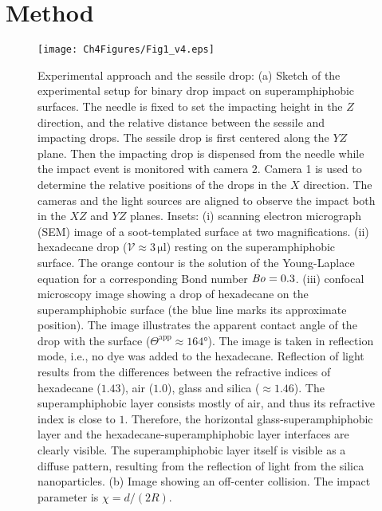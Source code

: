 \section{Method}\label{Ch5:Method}
\begin{figure}
	\centering
	\texttt{[image: Ch4Figures/Fig1\_v4.eps]}
	\caption{Experimental approach and the sessile drop: (a) Sketch of the experimental setup for binary drop impact on superamphiphobic surfaces. The needle is fixed to set the impacting height in the $Z$ direction, and the relative distance between the sessile and impacting drops. The sessile drop is first centered along the $YZ$ plane. Then the impacting drop is dispensed from the needle while the impact event is monitored with camera 2.  Camera 1 is used to determine the relative positions of the drops in the $X$ direction. The cameras and the light sources are aligned to observe the impact both in the $XZ$ and $YZ$ planes. Insets: (i) scanning electron micrograph (SEM) image of a soot-templated surface at two magnifications. (ii) hexadecane drop ($\mathcal{V} \approx 3\,\si{\micro\litre}$) resting on the superamphiphobic surface. The orange contour is the solution of the Young-Laplace equation \cite{book-degennes} for a corresponding Bond number $\mathit{Bo} = 0.3$.  (iii) confocal microscopy image showing a drop of hexadecane on the superamphiphobic surface (the blue line marks its approximate position). The image illustrates the apparent contact angle of the drop with the surface ($\Theta^{\text{app}} \approx 164\si{\degree}$). The image is taken in reflection mode, i.e., no dye was added to the hexadecane. Reflection of light results from the differences between the refractive indices of hexadecane ($1.43$), air ($1.0$), glass and silica ($\approx 1.46$). The superamphiphobic layer consists mostly of air, and thus its refractive index is close to $1$. Therefore, the horizontal glass-superamphiphobic layer and the hexadecane-superamphiphobic layer interfaces are clearly visible. The superamphiphobic layer itself is visible as a diffuse pattern, resulting from the reflection of light from the silica nanoparticles.  (b) Image showing an off-center collision. The impact parameter is $\chi = d/(2R)$. }
	\label{ChDoD:fig1}
\end{figure}

